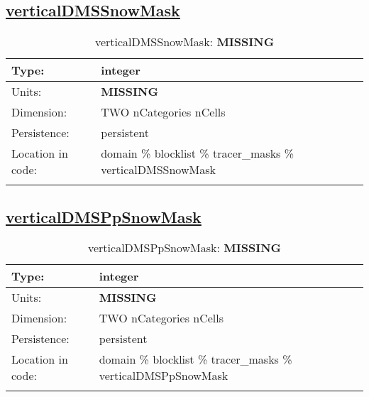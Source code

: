 \subsection[verticalDMSSnowMask]{\hyperref[sec:var_tab_tracer_masks]{verticalDMSSnowMask}}
\label{subsec:var_sec_tracer_masks_verticalDMSSnowMask}
\begin{center}
\begin{longtable}{| p{2.0in} | p{4.0in} |}
        \hline 
        Type: & integer \\
        \hline 
        Units: & {\bf \color{red} MISSING} \\
        \hline 
        Dimension: & TWO nCategories nCells \\
        \hline 
        Persistence: & persistent \\
        \hline 
         Location in code: & domain \% blocklist \% tracer\_masks \% verticalDMSSnowMask \\
         \hline 
    \caption{verticalDMSSnowMask: {\bf \color{red} MISSING}}
\end{longtable}
\end{center}
\subsection[verticalDMSPpSnowMask]{\hyperref[sec:var_tab_tracer_masks]{verticalDMSPpSnowMask}}
\label{subsec:var_sec_tracer_masks_verticalDMSPpSnowMask}
\begin{center}
\begin{longtable}{| p{2.0in} | p{4.0in} |}
        \hline 
        Type: & integer \\
        \hline 
        Units: & {\bf \color{red} MISSING} \\
        \hline 
        Dimension: & TWO nCategories nCells \\
        \hline 
        Persistence: & persistent \\
        \hline 
         Location in code: & domain \% blocklist \% tracer\_masks \% verticalDMSPpSnowMask \\
         \hline 
    \caption{verticalDMSPpSnowMask: {\bf \color{red} MISSING}}
\end{longtable}
\end{center}
